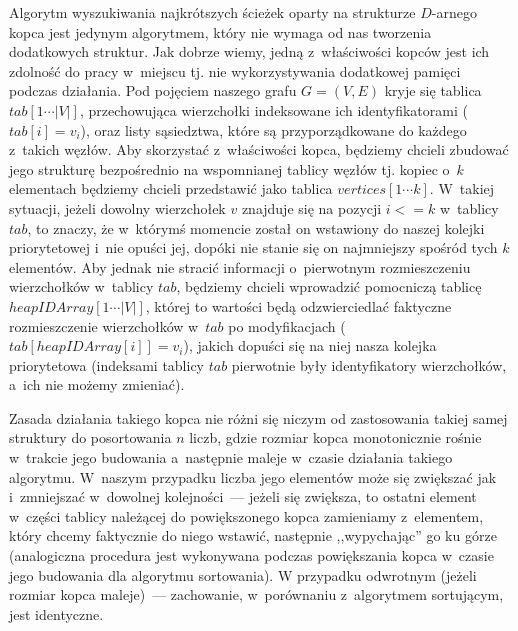 Algorytm wyszukiwania najkrótszych ścieżek oparty na strukturze $D$-arnego kopca jest jedynym algorytmem, który nie wymaga od nas tworzenia dodatkowych struktur. Jak dobrze wiemy, jedną z~właściwości kopców jest ich zdolność do pracy w~miejscu tj. nie wykorzystywania dodatkowej pamięci podczas działania. Pod pojęciem naszego grafu $G = \left( V, E \right)$ kryje się tablica $tab \left[ 1 \cdots \left| V\right| \right]$, przechowująca wierzchołki indeksowane ich identyfikatorami ($tab[i]=v_{i}$), oraz listy sąsiedztwa, które są przyporządkowane do każdego z~takich węzłów. Aby skorzystać z~właściwości kopca, będziemy chcieli zbudować jego strukturę bezpośrednio na wspomnianej tablicy węzłów tj. kopiec o~$k$ elementach będziemy chcieli przedstawić jako tablica $vertices \left[ 1 \cdots k \right]$. W~takiej sytuacji, jeżeli dowolny wierzchołek $v$ znajduje się na pozycji $i <= k $ w~tablicy $tab$, to znaczy, że w~którymś momencie został on wstawiony do naszej kolejki priorytetowej i~nie opuści jej, dopóki nie stanie się on najmniejszy spośród tych $k$ elementów. Aby jednak nie stracić informacji o~pierwotnym rozmieszczeniu wierzchołków w~tablicy $tab$, będziemy chcieli wprowadzić pomocniczą tablicę $heapIDArray \left[ 1 \cdots \left| V\right| \right]$, której to wartości będą odzwierciedlać faktyczne rozmieszczenie wierzchołków w~$tab$ po modyfikacjach ($tab \left[ heapIDArray \left[ i \right] \right] = v_{i}$), jakich dopuści się na niej nasza kolejka priorytetowa (indeksami tablicy $tab$ pierwotnie były identyfikatory wierzchołków, a~ich nie możemy zmieniać).

Zasada działania takiego kopca nie różni się niczym od zastosowania takiej samej struktury do posortowania $n$ liczb, gdzie rozmiar kopca monotonicznie rośnie w~trakcie jego budowania a~następnie maleje w~czasie działania takiego algorytmu. W~naszym przypadku liczba jego elementów może się zwiększać jak i~zmniejszać w~dowolnej kolejności~--- jeżeli się zwiększa, to ostatni element w~części tablicy należącej do powiększonego kopca zamieniamy z~elementem, który chcemy faktycznie do niego wstawić, następnie ,,wypychając'' go ku górze (analogiczna procedura jest wykonywana podczas powiększania kopca w~czasie jego budowania dla algorytmu sortowania). W przypadku odwrotnym (jeżeli rozmiar kopca maleje)~--- zachowanie, w~porównaniu z~algorytmem sortującym, jest identyczne.

